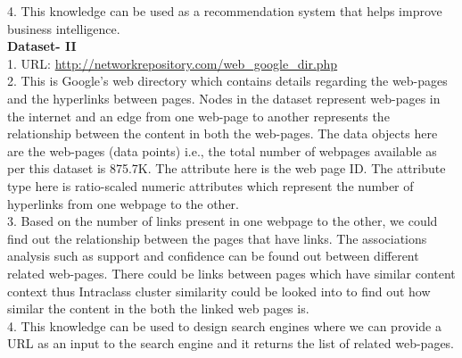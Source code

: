 \documentclass[10pt]{article}
\begin{document}
\begin{flushleft}
4. This knowledge can be used as a recommendation system that helps improve business intelligence.\\
\vspace{1em}
\textbf{Dataset- II}\\
\vspace{1em}
1. URL: \url{http://networkrepository.com/web_google_dir.php}\\
\vspace{1em}
2. This is Google's web directory which contains details regarding the web-pages and the hyperlinks between pages. Nodes in the dataset represent web-pages in the internet and an edge from one web-page to another represents the relationship between the content in both the web-pages. The data objects here are the web-pages (data points) i.e., the total number of webpages available as per this dataset is 875.7K. The attribute here is the web page ID. The attribute type here is ratio-scaled numeric attributes which represent the number of hyperlinks from one webpage to the other.\\ 
\vspace{1em}
3. Based on the number of links present in one webpage to the other, we could find out the relationship between the pages that have links. The associations analysis such as support and confidence can be found out between different related web-pages. There could be links between pages which have similar content context thus Intraclass cluster similarity could be looked into to find out how similar the content in the both the linked web pages is.\\
\vspace{1em}
4. This knowledge can be used to design search engines where we can provide a URL as an input to the search engine and it returns the list of related web-pages.\\
\vspace{1em}
\end{flushleft}
\end{document}
